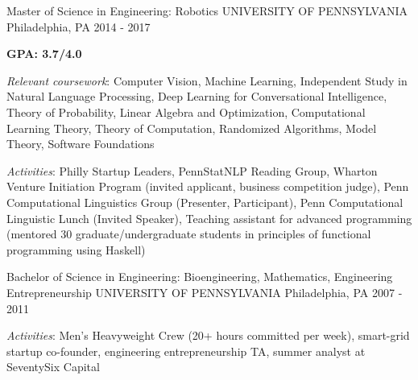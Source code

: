 \begin{cventries}
  \cventry
    {Master of Science in Engineering: Robotics}
    {UNIVERSITY OF PENNSYLVANIA}
    {Philadelphia, PA}
    {2014 - 2017}
    {
      \begin{cvitems}
        \item \textbf{GPA: 3.7/4.0}
        \item \textit{Relevant coursework}: Computer Vision, Machine Learning, Independent Study in Natural Language Processing, Deep Learning for Conversational Intelligence, Theory of Probability, Linear Algebra and Optimization, Computational Learning Theory, Theory of Computation, Randomized Algorithms, Model Theory, Software Foundations
        \item \textit{Activities}: Philly Startup Leaders, PennStatNLP Reading Group, Wharton Venture Initiation Program (invited applicant, business competition judge), Penn Computational Linguistics Group (Presenter, Participant),  Penn Computational Linguistic Lunch (Invited Speaker), Teaching assistant for advanced programming (mentored 30 graduate/undergraduate students in principles of functional programming using Haskell)
      \end{cvitems}
    }
  \cventry
    {Bachelor of Science in Engineering: Bioengineering, Mathematics, Engineering Entrepreneurship}
    {UNIVERSITY OF PENNSYLVANIA}
    {Philadelphia, PA}
    {2007 - 2011}
    {
      \begin{cvitems}
        \item \textit{Activities}: Men’s Heavyweight Crew (20+ hours committed per week), smart-grid startup co-founder, engineering entrepreneurship TA, summer analyst at SeventySix Capital
      \end{cvitems}
    }
\end{cventries}

